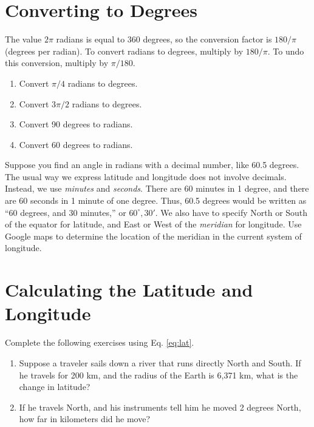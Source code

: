 \documentclass[12pt]{article}
\begin{document}
\section{Converting to Degrees}
\label{sec:deg}

The value $2\pi$ radians is equal to 360 degrees, so the conversion factor is $180/\pi$ (degrees per radian).  To convert radians to degrees, multiply by $180/\pi$.  To undo this conversion, multiply by $\pi/180$.

\begin{enumerate}
\item Convert $\pi/4$ radians to degrees.
\item Convert $3\pi/2$ radians to degrees.
\item Convert 90 degrees to radians.
\item Convert 60 degrees to radians.
\end{enumerate}

Suppose you find an angle in radians with a decimal number, like 60.5 degrees.  The usual way we express latitude and longitude does not involve decimals.  Instead, we use \textit{minutes} and \textit{seconds}.  There are 60 minutes in 1 degree, and there are 60 seconds in 1 minute of one degree.  Thus, 60.5 degrees would be written as ``60 degrees, and 30 minutes,'' or $60^{\circ}, 30'$.  We also have to specify North or South of the equator for latitude, and East or West of the \textit{meridian} for longitude.  Use Google maps to determine the location of the meridian in the current system of longitude.

\section{Calculating the Latitude and Longitude}
\label{sec:exer}

Complete the following exercises using Eq. \ref{eq:lat}.

\begin{enumerate}
\item Suppose a traveler sails down a river that runs directly North and South.  If he travels for 200 km, and the radius of the Earth is 6,371 km, what is the change in latitude? \\ \vspace{2cm}
\item If he travels North, and his instruments tell him he moved 2 degrees North, how far in kilometers did he move? \\ \vspace{2cm}
\end{enumerate}
\end{document}
